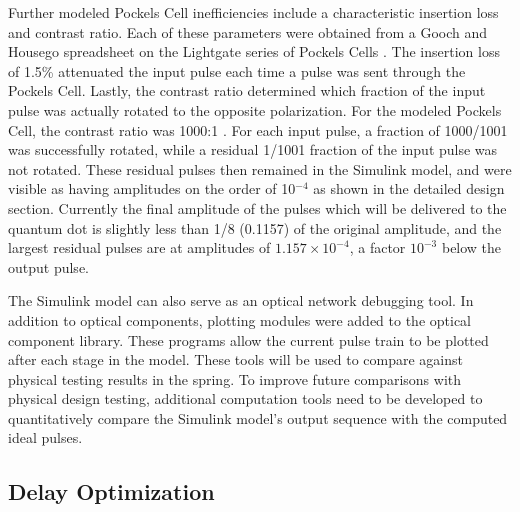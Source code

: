 \documentclass[pdftex,12pt,a4paper]{article}
\begin{document}
Further modeled Pockels Cell inefficiencies include a characteristic insertion loss and contrast ratio. Each of these parameters were obtained from a Gooch and Housego spreadsheet on the Lightgate series of Pockels Cells \cite{lightgate_pockel}. The insertion loss of 1.5\% attenuated the input pulse each time a pulse was sent through the Pockels Cell. Lastly, the contrast ratio determined which fraction of the input pulse was actually rotated to the opposite polarization. For the modeled Pockels Cell, the contrast ratio was 1000:1  \cite{lightgate_pockel}. For each input pulse, a fraction of 1000/1001 was successfully rotated, while a residual 1/1001 fraction of the input pulse was not rotated. These residual pulses then remained in the Simulink model, and were visible as having amplitudes on the order of 10$^{-4}$ as shown in the detailed design section. Currently the final amplitude of the pulses which will be delivered to the quantum dot is slightly less than 1/8 (0.1157) of the original amplitude, and the largest residual pulses are at amplitudes of $1.157 \times 10^{-4}$, a factor $10^{-3}$ below the output pulse. 

The Simulink model can also serve as an optical network debugging tool. In addition to optical components, plotting modules were added to the optical component library. These programs allow the current pulse train to be plotted after each stage in the model. These tools will be used to compare against physical testing results in the spring. To improve future comparisons with physical design testing, additional computation tools need to be developed to quantitatively compare the Simulink model's output sequence with the computed ideal pulses. 


\subsection{Delay Optimization}
\label{sec:optimizing}
\end{document}
